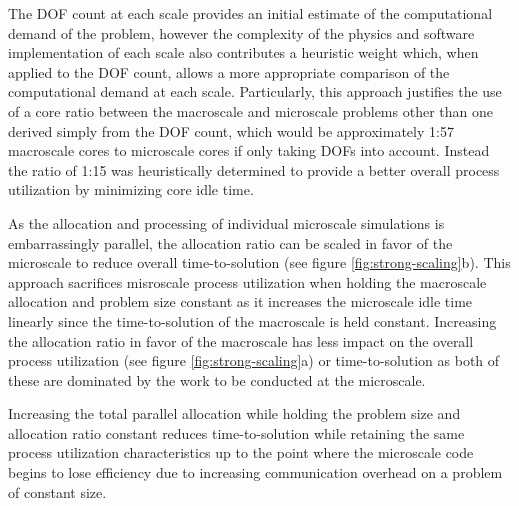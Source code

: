 \documentclass[]{interact}
\begin{document}
The DOF count at each scale provides an initial estimate of the computational demand of the problem, however the complexity of the physics and software implementation of each scale also contributes a heuristic weight which, when applied to the DOF count, allows a more appropriate comparison of the computational demand at each scale. Particularly, this approach justifies the use of a core ratio between the macroscale and microscale problems other than one derived simply from the DOF count, which would be approximately 1:57 macroscale cores to microscale cores if only taking DOFs into account. Instead the ratio of 1:15 was heuristically determined to provide a better overall process utilization by minimizing core idle time.
%

As the allocation and processing of individual microscale simulations is embarrassingly parallel, the allocation ratio can be scaled in favor of the microscale to reduce overall time-to-solution (see figure \ref{fig:strong-scaling}b). This approach sacrifices misroscale process utilization when holding the macroscale allocation and problem size constant as it increases the microscale idle time linearly since the time-to-solution of the macroscale is held constant. Increasing the allocation ratio in favor of the macroscale has less impact on the overall process utilization (see figure \ref{fig:strong-scaling}a) or time-to-solution as both of these are dominated by the work to be conducted at the microscale.

Increasing the total parallel allocation while holding the problem size and allocation ratio constant reduces time-to-solution while retaining the same process utilization characteristics up to the point where the microscale code begins to lose efficiency due to increasing communication overhead on a problem of constant size.
\end{document}
